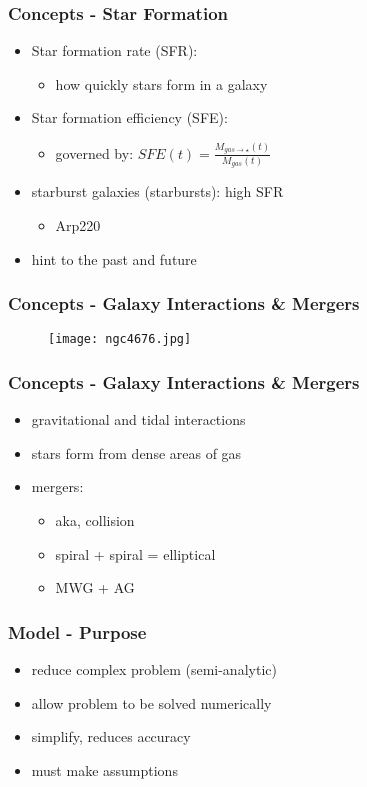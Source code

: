\documentclass{beamer}
\begin{document}
\begin{frame}
  \frametitle{Concepts - Star Formation}
  \begin{itemize}
    \item Star formation rate (SFR):
    \begin{itemize}
      \item how quickly stars form in a galaxy
    \end{itemize}
    \item Star formation efficiency (SFE):
    \begin{itemize}
      \item governed by: $SFE(t) = \frac{M_{gas \to \star}(t)}{M_{gas}(t)}$
    \end{itemize}
    \item starburst galaxies (starbursts): high SFR
    \begin{itemize}
      \item Arp220
    \end{itemize}
    \item hint to the past and future
  \end{itemize}
\end{frame}

\begin{frame}
  \frametitle{Concepts - Galaxy Interactions \& Mergers}
  \begin{figure}
    \texttt{[image: ngc4676.jpg]}
  \end{figure}
\end{frame}

\begin{frame}
  \frametitle{Concepts - Galaxy Interactions \& Mergers}
  \begin{itemize}
    \item gravitational and tidal interactions
    \item stars form from dense areas of gas
    \item mergers:
    \begin{itemize}
      \item aka, collision
      \item spiral + spiral = elliptical
      \item MWG + AG
    \end{itemize}
  \end{itemize}
\end{frame}

\begin{frame}
  \frametitle{Model - Purpose}
  \begin{itemize}
    \item reduce complex problem (semi-analytic)
    \item allow problem to be solved numerically
    \item simplify, reduces accuracy
    \item must make assumptions
  \end{itemize}
\end{frame}
\end{document}
